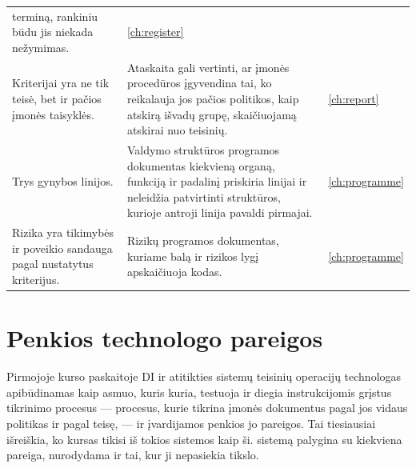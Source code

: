\begin{xltabular}{\textwidth}{@{}L{40mm}YL{20mm}@{}}
  terminą, rankiniu būdu jis niekada nežymimas. &
  \cref{ch:register} \\
Kriterijai yra ne tik teisė, bet ir pačios įmonės taisyklės. &
  Ataskaita gali vertinti, ar įmonės procedūros įgyvendina tai, ko reikalauja jos pačios
  politikos, kaip atskirą išvadų grupę, skaičiuojamą atskirai nuo teisinių. & \cref{ch:report} \\
Trys gynybos linijos. &
  Valdymo struktūros programos dokumentas kiekvieną organą, funkciją ir padalinį priskiria
  linijai ir neleidžia patvirtinti struktūros, kurioje antroji linija pavaldi pirmajai. &
  \cref{ch:programme} \\
Rizika yra tikimybės ir poveikio sandauga pagal nustatytus kriterijus. &
  Rizikų programos dokumentas, kuriame balą ir rizikos lygį apskaičiuoja kodas. & \cref{ch:programme} \\
\end{xltabular}

\section{Penkios technologo pareigos}\label{sec:course:duties}

Pirmojoje kurso paskaitoje DI ir atitikties sistemų teisinių operacijų technologas apibūdinamas
kaip asmuo, kuris kuria, testuoja ir diegia instrukcijomis grįstus tikrinimo procesus ---
procesus, kurie tikrina įmonės dokumentus pagal jos vidaus politikas ir pagal teisę, --- ir
įvardijamos penkios jo pareigos. Tai tiesiausiai išreiškia, ko kursas tikisi iš tokios
sistemos kaip ši.  sistemą palygina su kiekviena pareiga, nurodydama ir
tai, kur ji nepasiekia tikslo.

